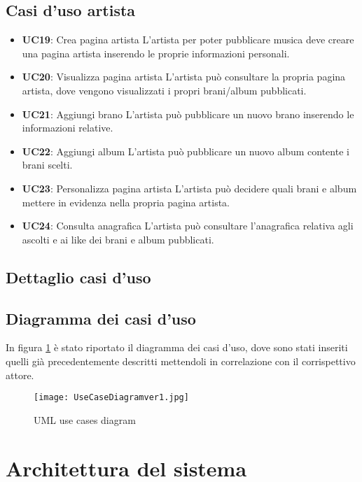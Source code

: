 \subsection{Casi d'uso artista}
\begin{itemize}
      \item \textbf{UC19}: Crea pagina artista L'artista per poter pubblicare musica deve
            creare una pagina artista inserendo le proprie informazioni personali.
      \item  \textbf{UC20}: Visualizza pagina artista L'artista può consultare la propria
            pagina artista, dove vengono visualizzati i propri brani/album pubblicati.
      \item  \textbf{UC21}: Aggiungi brano L'artista può pubblicare un nuovo brano
            inserendo le informazioni relative.
      \item  \textbf{UC22}: Aggiungi album L'artista può pubblicare un nuovo album contente
            i brani scelti.
      \item  \textbf{UC23}: Personalizza pagina artista L'artista può decidere quali brani
            e album mettere in evidenza nella propria pagina artista.
      \item  \textbf{UC24}: Consulta anagrafica L'artista può consultare l'anagrafica
            relativa agli ascolti e ai like dei brani e album pubblicati.

\end{itemize}

\subsection{Dettaglio casi d'uso}

\subsection{Diagramma dei casi d'uso}

In figura \ref{fig-uml-use-cases} è stato riportato il diagramma dei casi d'uso, dove sono stati inseriti quelli
già precedentemente descritti mettendoli in correlazione con il corrispettivo attore.

\begin{figure}[H]
      \centering
      \texttt{[image: UseCaseDiagramver1.jpg]}
      \caption{UML use cases diagram}
      \label{fig-uml-use-cases}
\end{figure}

\section{Architettura del sistema}

